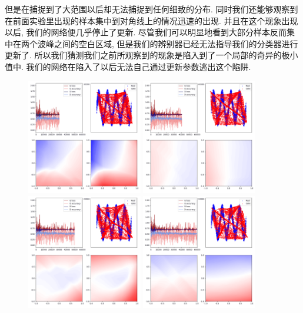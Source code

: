 \documentclass[lang=cn,11pt]{elegantpaper}
\begin{document}
 但是在捕捉到了大范围以后却无法捕捉到任何细致的分布. 同时我们还能够观察到在前面实验里出现的样本集中到对角线上的情况迅速的出现. 并且在这个现象出现以后, 我们的网络便几乎停止了更新. 尽管我们可以明显地看到大部分样本反而集中在两个波峰之间的空白区域, 但是我们的辨别器已经无法指导我们的分类器进行更新了. 所以我们猜测我们之前所观察到的现象是陷入到了一个局部的奇异的极小值中. 我们的网络在陷入了以后无法自己通过更新参数逃出这个陷阱.

\begin{figure}[hbt]
\centering
  \includegraphics[width=0.45\textwidth]{sin_6_1}
  \includegraphics[width=0.45\textwidth]{sin_6_2}\\
  \includegraphics[width=0.45\textwidth]{sin_6_3}
  \includegraphics[width=0.45\textwidth]{sin_6_4}
  \caption{}
\end{figure}
\end{document}
